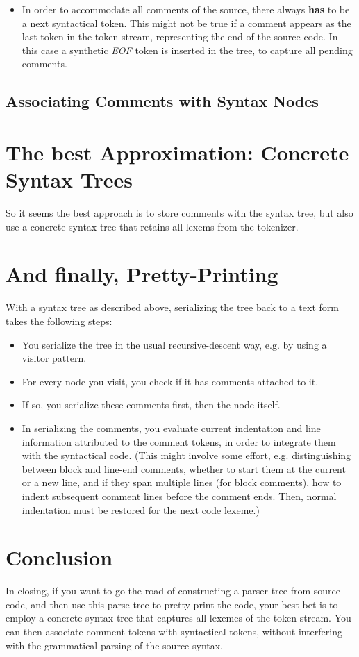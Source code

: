 \documentclass[11pt,a4paper]{article}
\begin{document}
\begin{itemize}
\item In order to accommodate all comments of the source, there always
  \textbf{has} to be a next syntactical token. This might not be true if a
  comment appears as the last token in the token stream, representing the end of
  the source code. In this case a synthetic \textit{EOF} token is inserted in
  the tree, to capture all pending comments.
\end{itemize}

\subsection{Associating Comments with Syntax Nodes}

\section{The best Approximation: Concrete Syntax Trees}

So it seems the best approach is to store comments with the syntax tree, but
also use a concrete syntax tree that retains all lexems from the tokenizer. 

\section{And finally, Pretty-Printing}

With a syntax tree as described above, serializing the tree back to a text form
takes the following steps:

\begin{itemize}
\item You serialize the tree in the usual recursive-descent way, e.g. by using a
visitor pattern.
\item For every node you visit, you check if it has comments attached to it.
\item If so, you serialize these comments first, then the node itself.
\item In serializing the comments, you evaluate current indentation and line
information attributed to the comment tokens, in order to integrate them with
the syntactical code. (This might involve some effort, e.g. distinguishing
between block and line-end comments, whether to start them at the current or a
new line, and if they span multiple lines (for block comments), how to indent
subsequent comment lines before the comment ends. Then, normal indentation
must be restored for the next code lexeme.)
\end{itemize}

\section{Conclusion}

In closing, if you want to go the road of constructing a parser tree from source
code, and then use this parse tree to pretty-print the code, your best bet is to
employ a concrete syntax tree that captures all lexemes of the token stream. You
can then associate comment tokens with syntactical tokens, without interfering
with the grammatical parsing of the source syntax. 


\end{document}
